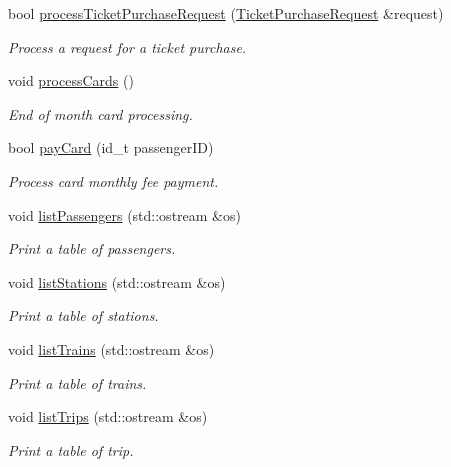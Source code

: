 \begin{DoxyCompactItemize}
bool \mbox{\hyperlink{classSystem_ac2b6f3d934b64f4fa56ffb1db1d261df}{process\+Ticket\+Purchase\+Request}} (\mbox{\hyperlink{classTicketPurchaseRequest}{Ticket\+Purchase\+Request}} \&request)
\begin{DoxyCompactList}\small\item\em Process a request for a ticket purchase. \end{DoxyCompactList}\item 
void \mbox{\hyperlink{classSystem_aebffe11376f68cb17175f30ea517c10b}{process\+Cards}} ()
\begin{DoxyCompactList}\small\item\em End of month card processing. \end{DoxyCompactList}\item 
bool \mbox{\hyperlink{classSystem_ae5df9c6b2309272f8642cb16dbe5132e}{pay\+Card}} (id\+\_\+t passenger\+ID)
\begin{DoxyCompactList}\small\item\em Process card monthly fee payment. \end{DoxyCompactList}\item 
void \mbox{\hyperlink{classSystem_a23c0b01d0e84fa4665ce85203ce6747b}{list\+Passengers}} (std\+::ostream \&os)
\begin{DoxyCompactList}\small\item\em Print a table of passengers. \end{DoxyCompactList}\item 
void \mbox{\hyperlink{classSystem_a06041827a7b47ad06eee9d121e42590c}{list\+Stations}} (std\+::ostream \&os)
\begin{DoxyCompactList}\small\item\em Print a table of stations. \end{DoxyCompactList}\item 
void \mbox{\hyperlink{classSystem_a0a6c0d8d1061893151f9b4ee3332ce85}{list\+Trains}} (std\+::ostream \&os)
\begin{DoxyCompactList}\small\item\em Print a table of trains. \end{DoxyCompactList}\item 
void \mbox{\hyperlink{classSystem_af11f201f6417c2658f35238d98c6f032}{list\+Trips}} (std\+::ostream \&os)
\begin{DoxyCompactList}\small\item\em Print a table of trip. \end{DoxyCompactList}\item 

\end{DoxyCompactItemize}
